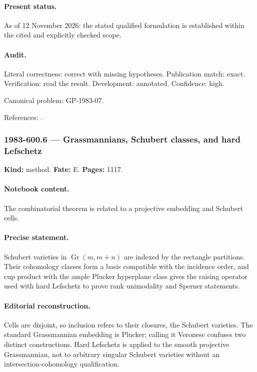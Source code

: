 \paragraph{Present status.} As of 12 November 2026: the stated qualified formulation is established within the cited and explicitly checked scope.

\paragraph{Audit.} Literal correctness: correct with missing hypotheses. Publication match: exact. Verification: read the result. Development: annotated. Confidence: high.

\noindent Canonical problem: GP-1983-07.\par

\noindent References: \citep{stanley1980weyl,stanley1984lefschetz}.\par

\subsubsection{1983-600.6 --- Grassmannians, Schubert classes, and hard Lefschetz}

\label{item:1983-600.6}

\noindent\textbf{Kind:} method. \textbf{Fate:} E. \textbf{Pages:} 1117.\par

\paragraph{Notebook content.} The combinatorial theorem is related to a projective embedding and Schubert cells.

\paragraph{Precise statement.} Schubert varieties in \(\operatorname{Gr}(m,m+n)\) are indexed by the rectangle partitions. Their cohomology classes form a basis compatible with the incidence order, and cup product with the ample Plucker hyperplane class gives the raising operator used with hard Lefschetz to prove rank unimodality and Sperner statements.

\paragraph{Editorial reconstruction.} Cells are disjoint, so inclusion refers to their closures, the Schubert varieties. The standard Grassmannian embedding is Plucker; calling it Veronese confuses two distinct constructions. Hard Lefschetz is applied to the smooth projective Grassmannian, not to arbitrary singular Schubert varieties without an intersection-cohomology qualification.

